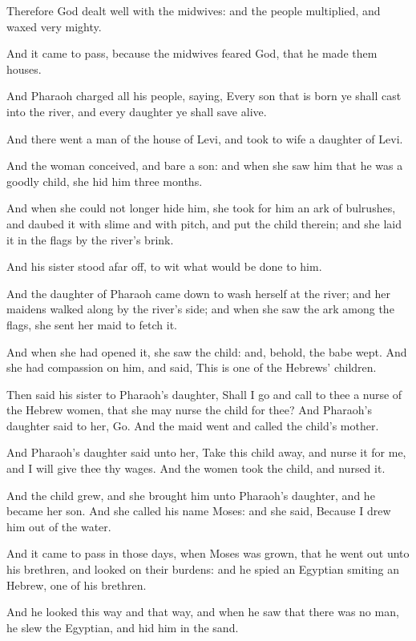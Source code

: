 \Verse Therefore God dealt well with the midwives: and the people multiplied, and waxed very mighty.

\Verse And it came to pass, because the midwives feared God, that he made them houses.

\Verse And Pharaoh charged all his people, saying, Every son that is born ye shall cast into the river, and every daughter ye shall save alive.

\Chapter
\Verse And there went a man of the house of Levi, and took to wife a daughter of Levi.

\Verse And the woman conceived, and bare a son: and when she saw him that he was a goodly child, she hid him three months.

\Verse And when she could not longer hide him, she took for him an ark of bulrushes, and daubed it with slime and with pitch, and put the child therein; and she laid it in the flags by the river's brink.

\Verse And his sister stood afar off, to wit what would be done to him.

\Verse And the daughter of Pharaoh came down to wash herself at the river; and her maidens walked along by the river's side; and when she saw the ark among the flags, she sent her maid to fetch it.

\Verse And when she had opened it, she saw the child: and, behold, the babe wept. And she had compassion on him, and said, This is one of the Hebrews' children.

\Verse Then said his sister to Pharaoh's daughter, Shall I go and call to thee a nurse of the Hebrew women, that she may nurse the child for thee?  \Verse And Pharaoh's daughter said to her, Go. And the maid went and called the child's mother.

\Verse And Pharaoh's daughter said unto her, Take this child away, and nurse it for me, and I will give thee thy wages. And the women took the child, and nursed it.

\Verse And the child grew, and she brought him unto Pharaoh's daughter, and he became her son. And she called his name Moses: and she said, Because I drew him out of the water.

\Verse And it came to pass in those days, when Moses was grown, that he went out unto his brethren, and looked on their burdens: and he spied an Egyptian smiting an Hebrew, one of his brethren.

\Verse And he looked this way and that way, and when he saw that there was no man, he slew the Egyptian, and hid him in the sand.

